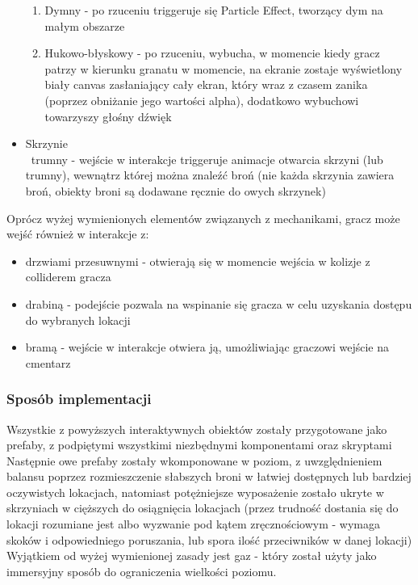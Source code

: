 \begin{itemize}
\begin{enumerate}
        \item Dymny - po rzuceniu triggeruje się Particle Effect, tworzący dym na małym obszarze
        \item Hukowo-błyskowy - po rzuceniu, wybucha, w momencie kiedy gracz patrzy w kierunku granatu w momencie, na ekranie zostaje wyświetlony biały canvas zasłaniający cały ekran, który wraz z czasem zanika (poprzez obniżanie jego wartości alpha), dodatkowo wybuchowi towarzyszy głośny dźwięk
    \end{enumerate}
    \item Skrzynie\\\ trumny - wejście w interakcje triggeruje animacje otwarcia skrzyni (lub trumny), wewnątrz której można znaleźć broń (nie każda skrzynia zawiera broń, obiekty broni są dodawane ręcznie do owych skrzynek)
    \end{itemize}
Oprócz wyżej wymienionych elementów związanych z mechanikami, gracz może wejść również w interakcje z:
    \begin{itemize}
        \item drzwiami przesuwnymi - otwierają się w momencie wejścia w kolizje z colliderem gracza
        \item drabiną - podejście pozwala na wspinanie się gracza w celu uzyskania dostępu do wybranych lokacji
        \item bramą - wejście w interakcje otwiera ją, umożliwiając graczowi wejście na cmentarz
    \end{itemize}
\subsubsection{Sposób implementacji}
Wszystkie z powyższych interaktywnych obiektów zostały przygotowane jako prefaby, z podpiętymi wszystkimi niezbędnymi komponentami oraz skryptami \\
Następnie owe prefaby zostały wkomponowane w poziom, z uwzględnieniem balansu poprzez rozmieszczenie słabszych broni w łatwiej dostępnych lub bardziej oczywistych lokacjach, natomiast potężniejsze wyposażenie zostało ukryte w skrzyniach w cięższych do osiągnięcia lokacjach (przez trudność dostania się do lokacji rozumiane jest albo wyzwanie pod kątem zręcznościowym - wymaga skoków i odpowiedniego poruszania, lub spora ilość przeciwników w danej lokacji)
Wyjątkiem od wyżej wymienionej zasady jest gaz - który został użyty jako immersyjny sposób do ograniczenia wielkości poziomu.


